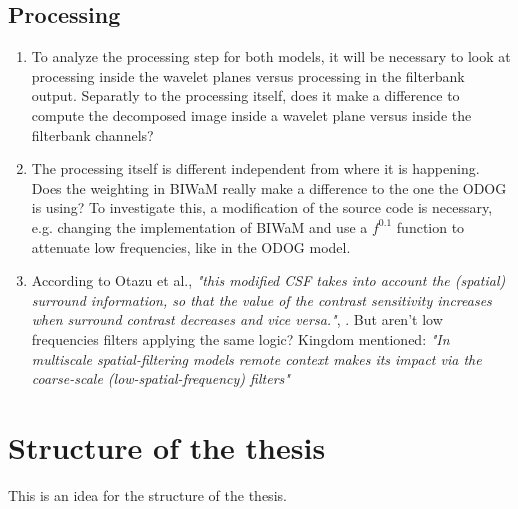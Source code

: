 \subsection*{Processing}
\begin{enumerate}
    \item To analyze the processing step for both models, it will be necessary to look at
    processing inside the wavelet planes versus processing in the filterbank output.
    Separatly to the processing itself, does it make a difference to compute the
    decomposed image inside a wavelet plane versus inside the filterbank channels?
    \item The processing itself is different independent from where it is happening. Does
    the weighting in BIWaM really make a difference to the one the ODOG is using? To
    investigate this, a modification of the source code is necessary, e.g. changing the
    implementation of BIWaM and use a $f^{0.1}$ function to attenuate low frequencies,
    like in the ODOG model.
    \item According to Otazu et al., \emph{"this modified CSF takes into account the
    (spatial) surround information, so that the value of the contrast sensitivity
    increases when surround contrast decreases and vice versa."}, \parencite{Otazu2008}.
    But aren't low frequencies filters applying the same logic? Kingdom mentioned:
    \emph{"In multiscale spatial-filtering models remote context makes its impact via the
    coarse-scale (low-spatial-frequency) filters"}
    \parencite{Kingdom2014}
\end{enumerate}


\newpage

\section{Structure of the thesis}

This is an idea for the structure of the thesis.

